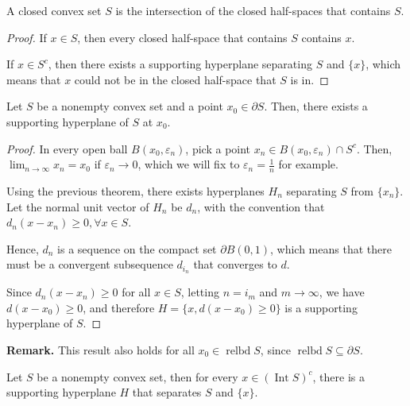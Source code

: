 \begin{corollary}
  A closed convex set \( S \) is the intersection of the closed half-spaces that
  contains \( S \).
\end{corollary}

\begin{proof}
  If \( x \in S \), then every closed half-space that contains \( S \) contains
  \( x \).

  If \( x \in S^{c} \), then there exists a supporting hyperplane separating \(
  S\) and \( \{x\}   \), which means that \( x \) could not be in the closed
  half-space that \( S \) is in.
\end{proof}


\begin{theorem}
  \label{thr:Supporting Hyperplane Theorem}
  Let \( S \) be a nonempty convex set and a point \( x_{0} \in \partial S \).
  Then, there exists a supporting hyperplane of \( S \) at \( x_{0} \).
\end{theorem}

\begin{proof}
  In every open ball \( B(x_{0}, \varepsilon_{n}) \), pick a point \( x_{n} \in
  B(x_{0}, \varepsilon_{n}) \cap  S^{c}\). Then, \( \lim_{n \to \infty} x_{n} =
  x_{0}\) if \( \varepsilon_{n} \to  0 \), which we will fix to \( \varepsilon_{n}
  = \frac{1}{n}\) for example.

  Using the previous theorem, there exists hyperplanes \( H_{n} \) separating \(
  S\) from \( \{x_{n}\}   \). Let the normal unit vector of \( H_{n} \) be \(
  d_{n} \), with the convention that \( d_{n}(x-x_{n}) \ge 0, \forall  x \in
  S \).

  Hence, \( d_{n} \) is a sequence on the compact set \( \partial B(0, 1) \),
  which means that there must be a convergent subsequence \( d_{i_{n}} \) that
  converges to \( d \).

  Since \( d_{n}(x-x_{n}) \ge 0 \) for all \( x \in S \), letting \( n = i_{m}
  \) and \( m \to  \infty \), we have \( d(x-x_{0}) \ge 0 \), and therefore \(
  H=\{x, d(x-x_{0})\ge 0\}   \) is a supporting hyperplane of \( S \).
\end{proof}

\textbf{Remark. } This result also holds for all \( x_{0} \in
\operatorname{relbd} S
\), since \( \operatorname{relbd} S \subseteq \partial S \).

\begin{corollary}
\label{cor:hst-set-pt}
  Let \( S \) be a nonempty convex set, then for every \( x \in
  (\operatorname{Int} S)^{c} \), there is a supporting hyperplane \( H \) that
  separates \( S \) and \( \{ x\}   \).
\end{corollary}

